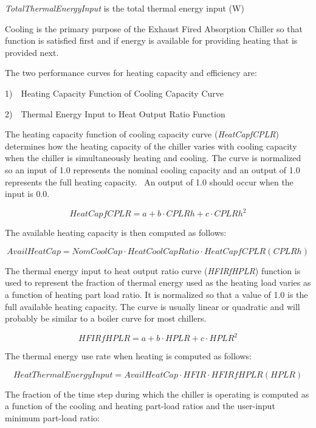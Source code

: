 \emph{TotalThermalEnergyInput} is the total thermal energy input (W)

Cooling is the primary purpose of the Exhaust Fired Absorption Chiller so that function is satisfied first and if energy is available for providing heating that is provided next.

The two performance curves for heating capacity and efficiency are:

1)~~Heating Capacity Function of Cooling Capacity Curve

2)~~Thermal Energy Input to Heat Output Ratio Function

The heating capacity function of cooling capacity curve (\emph{HeatCapfCPLR}) determines how the heating capacity of the chiller varies with cooling capacity when the chiller is simultaneously heating and cooling. The curve is normalized so an input of 1.0 represents the nominal cooling capacity and an output of 1.0 represents the full heating capacity.~ An output of 1.0 should occur when the input is 0.0.

\begin{equation}
HeatCapfCPLR = a + b \cdot CPLRh + c \cdot CPLR{h^2}
\end{equation}

The available heating capacity is then computed as follows:

\begin{equation}
AvailHeatCap = NomCoolCap \cdot HeatCoolCapRatio \cdot HeatCapfCPLR(CPLRh)
\end{equation}

The thermal energy input to heat output ratio curve (\emph{HFIRfHPLR}) function is used to represent the fraction of thermal energy used as the heating load varies as a function of heating part load ratio. It is normalized so that a value of 1.0 is the full available heating capacity. The curve is usually linear or quadratic and will probably be similar to a boiler curve for most chillers.

\begin{equation}
HFIRfHPLR = a + b \cdot HPLR + c \cdot HPL{R^2}
\end{equation}

The thermal energy use rate when heating is computed as follows:

\begin{equation}
HeatThermalEnergyInput = AvailHeatCap \cdot HFIR \cdot HFIRfHPLR(HPLR)
\end{equation}

The fraction of the time step during which the chiller is operating is computed as a function of the cooling and heating part-load ratios and the user-input minimum part-load ratio:

